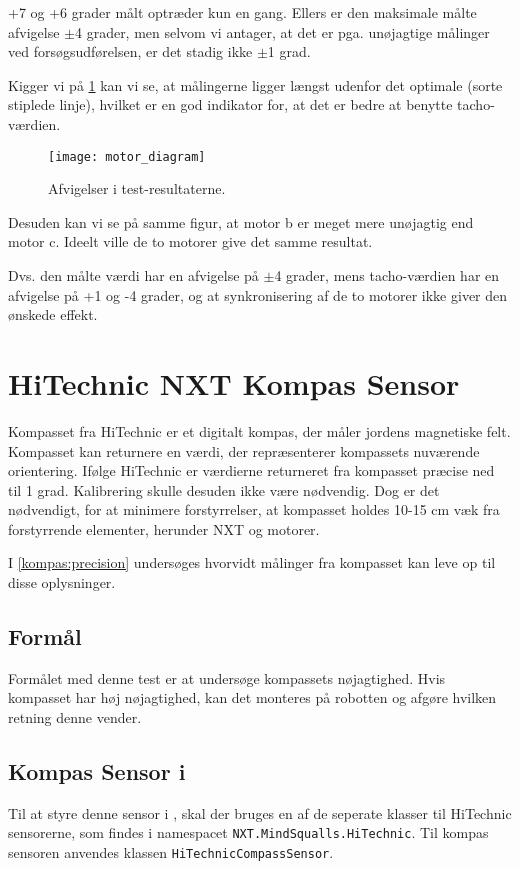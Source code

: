 +7 og +6 grader målt optræder kun en gang.
Ellers er den maksimale målte afvigelse $\pm$4 grader, men selvom vi antager, at det er pga. unøjagtige målinger ved forsøgsudførelsen, er det stadig ikke $\pm$1 grad.

Kigger vi på \cref{sensor:motor_sensor_diagram} kan vi se, at målingerne ligger længst udenfor det optimale (sorte stiplede linje), hvilket er en god indikator for, at det er bedre at benytte tacho-værdien.

\begin{figure}
\texttt{[image: motor\_diagram]}
\caption{Afvigelser i test-resultaterne.}
\label{sensor:motor_sensor_diagram}
\end{figure}

Desuden kan vi se på samme figur, at motor b er meget mere unøjagtig end motor c.
Ideelt ville de to motorer give det samme resultat.

Dvs. den målte værdi har en afvigelse på $\pm$4 grader, mens tacho-værdien har en afvigelse på +1 og -4 grader, og at synkronisering af de to motorer ikke giver den ønskede effekt.

\section{HiTechnic NXT Kompas Sensor}
Kompasset fra HiTechnic er et digitalt kompas, der måler jordens magnetiske felt.
Kompasset kan returnere en værdi, der repræsenterer kompassets nuværende orientering.
Ifølge HiTechnic er værdierne returneret fra kompasset præcise ned til 1 grad.
Kalibrering skulle desuden ikke være nødvendig.
Dog er det nødvendigt, for at minimere forstyrrelser, at kompasset holdes 10-15 cm væk fra forstyrrende elementer, herunder \lego NXT og motorer.\cite{hitechnic_compass}

I \cref{kompas:precision} undersøges hvorvidt målinger fra kompasset kan leve op til disse oplysninger.

\subsection{Formål}
Formålet med denne test er at undersøge kompassets nøjagtighed.
Hvis kompasset har høj nøjagtighed, kan det monteres på robotten og afgøre hvilken retning denne vender.

\subsection{Kompas Sensor i \mindsqualls}
Til at styre denne sensor i \mindsqualls, skal der bruges en af de seperate klasser til HiTechnic sensorerne, som findes i namespacet \lstinline[style=csharp]!NXT.MindSqualls.HiTechnic!.
Til kompas sensoren anvendes klassen \lstinline[style=csharp]!HiTechnicCompassSensor!.

